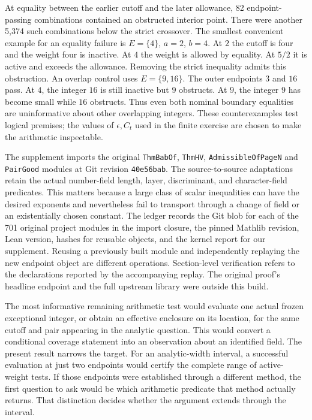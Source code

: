 \documentclass[12pt,letterpaper]{article}
\begin{document}
At equality between the earlier cutoff and the later allowance, 82 endpoint-passing combinations contained an obstructed interior point. There were another 5,374 such combinations below the strict crossover. The smallest convenient example for an equality failure is $E=\{4\}$, $a=2$, $b=4$. At $2$ the cutoff is four and the weight four is inactive. At $4$ the weight is allowed by equality. At $5/2$ it is active and exceeds the allowance. Removing the strict inequality admits this obstruction. An overlap control uses $E=\{9,16\}$. The outer endpoints $3$ and $16$ pass. At $4$, the integer $16$ is still inactive but $9$ obstructs. At $9$, the integer $9$ has become small while $16$ obstructs. Thus even both nominal boundary equalities are uninformative about other overlapping integers. These counterexamples test logical premises; the values of $\epsilon,C_t$ used in the finite exercise are chosen to make the arithmetic inspectable.

The supplement imports the original \texttt{ThmBabOf}, \texttt{ThmHV}, \texttt{AdmissibleOfPageN} and \texttt{PairGood} modules at Git revision \texttt{40e56bab}. The source-to-source adaptations retain the actual number-field length, layer, discriminant, and character-field predicates. This matters because a large class of scalar inequalities can have the desired exponents and nevertheless fail to transport through a change of field or an existentially chosen constant. The ledger records the Git blob for each of the 701 original project modules in the import closure, the pinned Mathlib revision, Lean version, hashes for reusable objects, and the kernel report for our supplement. Reusing a previously built module and independently replaying the new endpoint object are different operations. Section-level verification refers to the declarations reported by the accompanying replay. The original proof's headline endpoint and the full upstream library were outside this build.

The most informative remaining arithmetic test would evaluate one actual frozen exceptional integer, or obtain an effective enclosure on its location, for the same cutoff and pair appearing in the analytic question. This would convert a conditional coverage statement into an observation about an identified field. The present result narrows the target. For an analytic-width interval, a successful evaluation at just two endpoints would certify the complete range of active-weight tests. If those endpoints were established through a different method, the first question to ask would be which arithmetic predicate that method actually returns. That distinction decides whether the argument extends through the interval.
\end{document}
